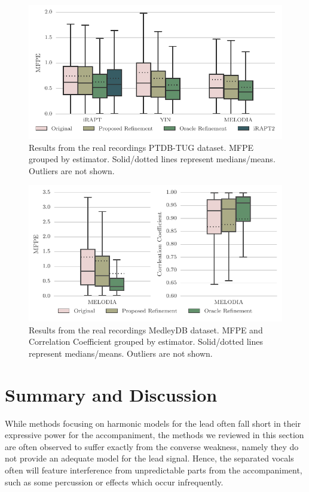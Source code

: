 \begin{figure}[t!]
\centering
		\includegraphics[width=0.90\columnwidth]{Chapters/05_Separation_Known/figures/stats_boxplot_ptdb_real.pdf}
\caption{Results from the real recordings PTDB-TUG dataset. MFPE grouped by estimator. Solid/dotted lines represent medians/means. Outliers are not shown.}
\label{fig:ptdbtug_real}
\end{figure}

\begin{figure}[t]
\centering
		\includegraphics[width=0.90\columnwidth]{Chapters/05_Separation_Known/figures/stats_boxplot_medley.pdf}
\caption{Results from the real recordings MedleyDB dataset. MFPE and Correlation Coefficient grouped by estimator. Solid/dotted lines represent medians/means. Outliers are not shown.}
\label{fig:medley}
\end{figure}

\section{Summary and Discussion}

While methods focusing on harmonic models for the lead often fall short in their expressive power for the accompaniment, the methods we reviewed in this section are often observed to suffer exactly from the converse weakness, namely they do not provide an adequate model for the lead signal. Hence, the separated vocals often will feature interference from unpredictable parts from the accompaniment, such as some percussion or effects which occur infrequently.

